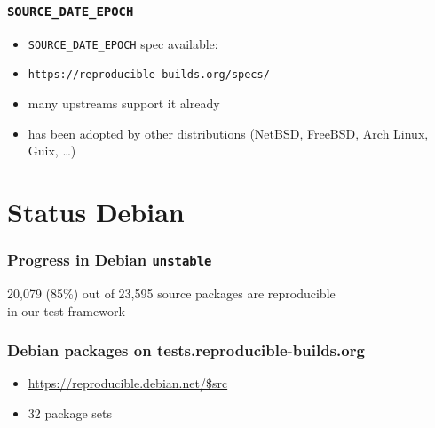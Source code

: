 \documentclass[14pt,aspectratio=169]{beamer}
\begin{document}
\begin{frame}
 \frametitle{\texttt{SOURCE\_DATE\_EPOCH}}

 \begin{itemize}
  \item \texttt{SOURCE\_DATE\_EPOCH} spec available:
  \item \texttt{https://reproducible-builds.org/specs/}
  \item many upstreams support it already
  \item has been adopted by other distributions
  (NetBSD, FreeBSD, Arch Linux, Guix, …)
 \end{itemize}
\end{frame}


\section{Status Debian}

\begin{frame}
 \frametitle{Progress in Debian \texttt{unstable}}
 \begin{center}
  \footnotesize{20,079 (85\%) out of 23,595 source packages are reproducible \\
    in our test framework}
  \vfill
 \end{center}
\end{frame}


\begin{frame}
 \frametitle{Debian packages on tests.reproducible-builds.org}
 \begin{itemize}
  \item \url{https://reproducible.debian.net/$src}
  \item 32 package sets 
 \end{itemize}
\end{frame}
\end{document}

